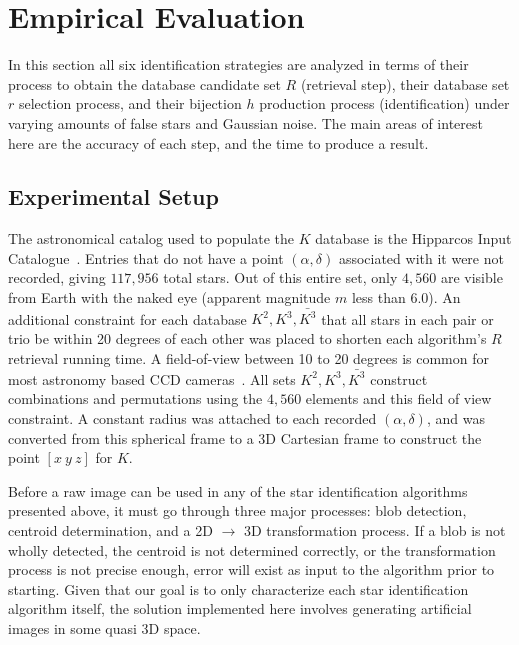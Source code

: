 \newcommand{\AVG}{\mathit{AVG}}

\section{Empirical Evaluation}\label{sec:empiricalEvaluation}
In this section all six identification strategies are analyzed in terms of their process to obtain the database
candidate set $R$ (retrieval step), their database set $r$ selection process, and their bijection $h$ production process
(identification) under varying amounts of false stars and Gaussian noise.
The main areas of interest here are the accuracy of each step, and the time to produce a result.


\subsection{Experimental Setup}\label{subsec:experimentalSetup}
The astronomical catalog used to populate the $K$ database is the Hipparcos Input
Catalogue~\cite{perryman:hipparcosCatalogue}.
Entries that do not have a point $\left( \alpha, \delta \right)$ associated with it were not recorded, giving
$117{,}956$ total stars.
Out of this entire set, only $4{,}560$ are visible from Earth with the naked eye (apparent magnitude $m$ less than 6.0).
An additional constraint for each database $K^2, K^3, \bar{K^3}$ that all stars in each pair or trio be within 20
degrees of each other was placed to shorten each algorithm's $R$ retrieval running time.
A field-of-view between 10 to 20 degrees is common for most astronomy based CCD
cameras~\cite{mortari:pyramidIdentification}.
All sets $K^2, K^3, \bar{K^3}$ construct combinations and permutations using the $4{,}560$ elements and this field
of view constraint.
A constant radius was attached to each recorded $\left(\alpha, \delta \right)$, and was converted from this spherical
frame to a 3D Cartesian frame to construct the point $[ x \ y \ z ]$ for $K$.

Before a raw image can be used in any of the star identification algorithms presented above, it must go through
three major processes: blob detection, centroid determination, and a 2D $\rightarrow$ 3D transformation process.
If a blob is not wholly detected, the centroid is not determined correctly, or the transformation process
is not precise enough, error will exist as input to the algorithm prior to starting.
Given that our goal is to only characterize each star identification algorithm itself, the solution implemented here
involves generating artificial images in some quasi 3D space.

